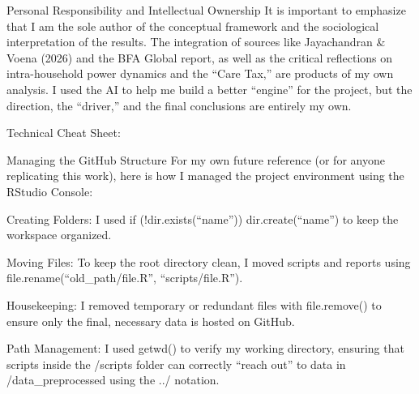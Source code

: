 \documentclass[
  letterpaper,
  DIV=11,
  numbers=noendperiod]{scrartcl}
\begin{document}
Personal Responsibility and Intellectual Ownership It is important to
emphasize that I am the sole author of the conceptual framework and the
sociological interpretation of the results. The integration of sources
like Jayachandran \& Voena (2026) and the BFA Global report, as well as
the critical reflections on intra-household power dynamics and the
``Care Tax,'' are products of my own analysis. I used the AI to help me
build a better ``engine'' for the project, but the direction, the
``driver,'' and the final conclusions are entirely my own.

Technical Cheat Sheet:

Managing the GitHub Structure For my own future reference (or for anyone
replicating this work), here is how I managed the project environment
using the RStudio Console:

Creating Folders: I used if (!dir.exists(``name'')) dir.create(``name'')
to keep the workspace organized.

Moving Files: To keep the root directory clean, I moved scripts and
reports using file.rename(``old\_path/file.R'', ``scripts/file.R'').

Housekeeping: I removed temporary or redundant files with file.remove()
to ensure only the final, necessary data is hosted on GitHub.

Path Management: I used getwd() to verify my working directory, ensuring
that scripts inside the /scripts folder can correctly ``reach out'' to
data in /data\_preprocessed using the ../ notation.
\end{document}
